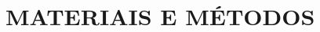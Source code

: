 \captionsetup{justification=centering,margin=0cm}

\chapter[MATERIAIS E MÉTODOS]{MATERIAIS E MÉTODOS}
\label{cap:materiais_e_metodos}


